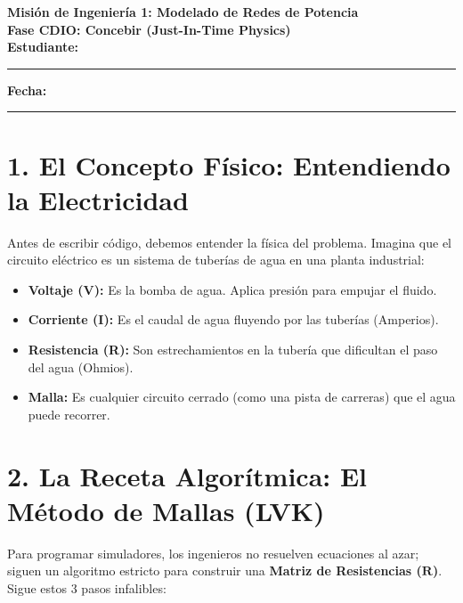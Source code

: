 \documentclass[11pt,a4paper]{article}
\begin{document}
\begin{center}
    {\Large \textbf{\textcolor{UCBblue}{Misión de Ingeniería 1: Modelado de Redes de Potencia}}}\\
    \vspace{0.3cm}
    {\large \textbf{Fase CDIO: Concebir (Just-In-Time Physics)}}\\
    \vspace{0.5cm}
    \textbf{Estudiante:} \rule{8cm}{0.4pt} \quad \textbf{Fecha:} \rule{3cm}{0.4pt}
\end{center}

\vspace{0.5cm}

\section*{1. El Concepto Físico: Entendiendo la Electricidad}
Antes de escribir código, debemos entender la física del problema. Imagina que el circuito eléctrico es un sistema de tuberías de agua en una planta industrial:
\begin{itemize}
    \item \textbf{Voltaje (V):} Es la bomba de agua. Aplica presión para empujar el fluido.
    \item \textbf{Corriente (I):} Es el caudal de agua fluyendo por las tuberías (Amperios).
    \item \textbf{Resistencia (R):} Son estrechamientos en la tubería que dificultan el paso del agua (Ohmios).
    \item \textbf{Malla:} Es cualquier circuito cerrado (como una pista de carreras) que el agua puede recorrer.
\end{itemize}

\section*{2. La Receta Algorítmica: El Método de Mallas (LVK)}
Para programar simuladores, los ingenieros no resuelven ecuaciones al azar; siguen un algoritmo estricto para construir una \textbf{Matriz de Resistencias ($\mathbf{R}$)}. Sigue estos 3 pasos infalibles:
\end{document}
